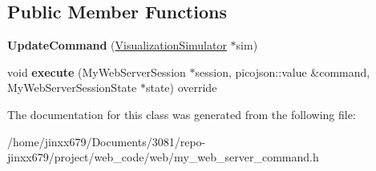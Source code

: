 \subsection*{Public Member Functions}
\begin{DoxyCompactItemize}
\item 
\mbox{\label{classUpdateCommand_a92dd1c6464bfc6b818cb89022a30be59}} 
{\bfseries Update\+Command} (\hyperlink{classVisualizationSimulator}{Visualization\+Simulator} $\ast$sim)
\item 
\mbox{\label{classUpdateCommand_a5e67533dd3a29268d24cadaa56ba9ee3}} 
void {\bfseries execute} (My\+Web\+Server\+Session $\ast$session, picojson\+::value \&command, My\+Web\+Server\+Session\+State $\ast$state) override
\end{DoxyCompactItemize}


The documentation for this class was generated from the following file\+:\begin{DoxyCompactItemize}
\item 
/home/jinxx679/\+Documents/3081/repo-\/jinxx679/project/web\+\_\+code/web/my\+\_\+web\+\_\+server\+\_\+command.\+h\end{DoxyCompactItemize}
